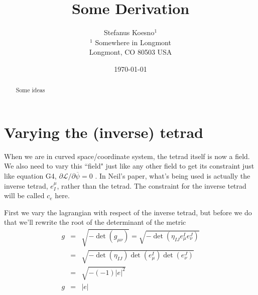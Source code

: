 \documentclass[aps,preprint,preprintnumbers,nofootinbib,showpacs,prd]{revtex4-1}
\newcommand{\nbea}{\begin{eqnarray*}}
\newcommand{\neea}{\end{eqnarray*}}
\begin{document}
\title{Some Derivation}
\bigskip
\author{Stefanus Koesno$^1$\\
$^1$ Somewhere in Longmont\\ Longmont, CO 80503 USA\\
}
%
\date{\today}
%
\begin{abstract}
Some ideas

\end{abstract}
%
\maketitle

\section{Varying the (inverse) tetrad}

\renewcommand{\theequation}{A.\arabic{equation}}  %
\setcounter{equation}{0}  %

When we are in curved space/coordinate system, the tetrad itself is now a field. We also need to vary this ``field" just like any other field to get its constraint just like equation G4, $\partial \mathcal{L}/\partial \overline \psi = 0$ . In Neil's paper, what's being used is actually the inverse tetrad, $e^\mu_I$, rather than the tetrad. The constraint for the inverse tetrad will be called $c_e$ here.

First we vary the lagrangian with respect of the inverse tetrad, but before we do that we'll rewrite the root of the determinant of the metric
%
\nbea
g & = & \sqrt{-\det(g_{\mu\nu})} = \sqrt{-\det(\eta_{IJ} e^I_\mu e^J_\nu)} \\
& = & \sqrt{-\det(\eta_{IJ}) \det(e^I_\mu) \det(e^J_\nu)} \\
& = & \sqrt{-(-1) |e|^2} \\
g & = & |e|
\neea
%
\end{document}

